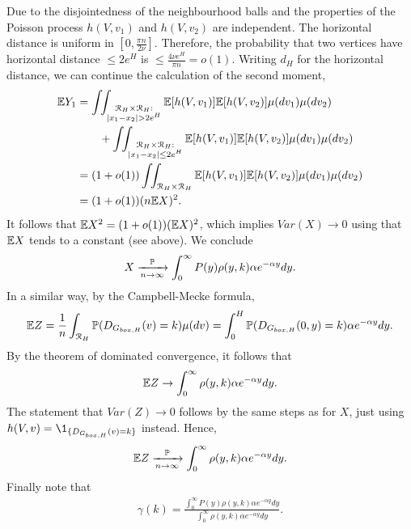 Due to the disjointedness of the neighbourhood balls and the properties of the Poisson process $h(V,v_1)$ and $h(V,v_2)$ are independent. The horizontal distance is uniform in $[0,\frac{\pi n}{2\nu}]$. Therefore, the probability that two vertices have horizontal distance $\leq 2e^H$ is $\leq \frac{4\nu e^H}{\pi n} = o(1)$. Writing $d_H$ for the horizontal distance, we can continue the calculation of the second moment,
\begin{align*}
\E Y_1 &= \int_{} \int_{\substack{\Rcal_H\times \Rcal_H:\\ |x_1-x_2|>2 e^H}} \E[ h(V,v_1)]\E[h(V,v_2)]\mu(dv_1)\mu(dv_2)\\
&\qquad+\int_{} \int_{\substack{\Rcal_H\times \Rcal_H:\\ |x_1-x_2|\leq2 e^H}} \E[ h(V,v_1)]\E[h(V,v_2)]\mu(dv_1)\mu(dv_2) \\
&= (1+o(1))\int_{} \int_{\Rcal_H\times \Rcal_H} \E[ h(V,v_1)]\E[h(V,v_2)]\mu(dv_1)\mu(dv_2) \\
&= (1+o(1)) (n\E X)^2.
\end{align*}
It follows that $\mathbb{E} X^2 = (1+o(1))(\mathbb{E} X)^2$, which implies $Var(X) \rightarrow 0$ using that $\mathbb{E} X$ tends to a constant (see above). We conclude
$$X \xrightarrow[n\rightarrow\infty]{\mathbb{P}} \int_0^\infty P(y)\rho(y,k)\alpha e^{-\alpha y}dy.$$
In a similar way, by the Campbell-Mecke formula,
\begin{align*}
\mathbb{E} Z =\frac{1}{n} \int_{{\mathcal R}_H} \mathbb{P}(D_{G_{box,H}}(v)=k) \mu(dv) = \int_0^H \mathbb{P}(D_{G_{box,H}}(0,y)=k) \alpha e^{-\alpha y}dy.
\end{align*}
By the theorem of dominated convergence, it follows that
\begin{align*}
\mathbb{E} Z \rightarrow \int_0^\infty \rho(y,k)\alpha e^{-\alpha y}dy.
\end{align*}
The statement that $Var(Z) \rightarrow 0$ follows by the same steps as for $X$, just using $h(V,v) = \1_{\{D_{\GboxH}(v)=k\}}$ instead. Hence,
\begin{align*}
\mathbb{E} Z \xrightarrow[n\rightarrow\infty]{\mathbb{P}} \int_0^\infty \rho(y,k)\alpha e^{-\alpha y}dy.
\end{align*}
Finally note that 
\begin{align*}
\gamma(k) = \frac{\int_0^\infty P(y)\rho(y,k)\alpha e^{-\alpha y}dy}{\int_0^\infty \rho(y,k)\alpha e^{-\alpha y}dy}.
\end{align*}

